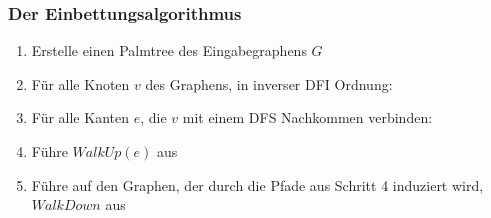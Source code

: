 \documentclass{beamer}
\begin{document}
\begin{frame}
{\begin{figure}
\begin{subfigure}{.48\textwidth}
\begin{tikzpicture}[every node/.style={draw, circle, fill=black!10,inner sep=0pt, minimum width=9pt},
                        edge_style/.style={draw=black}]
                    \end{tikzpicture}
                \end{subfigure}
            \end{figure}
        }
            
    \end{frame}

    \begin{frame}
        \frametitle{Der Einbettungsalgorithmus}
        \begin{enumerate}
            \item Erstelle einen Palmtree des Eingabegraphens $G$
            \item Für alle Knoten $v$ des Graphens, in inverser DFI Ordnung:
            \item \; Für alle Kanten $e$, die $v$ mit einem DFS Nachkommen verbinden:
            \item \; \; Führe $WalkUp(e)$ aus
            \item \; Führe auf den Graphen, der durch die Pfade aus Schritt 4 induziert wird, $WalkDown$ aus  
        \end{enumerate}
    \end{frame}
\end{document}
